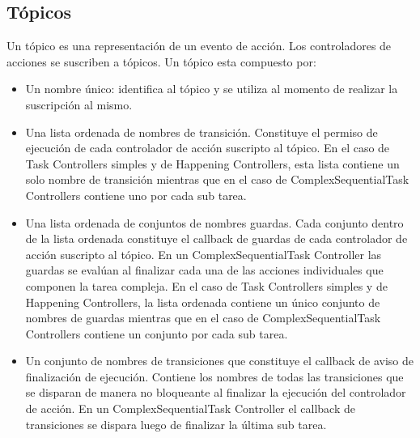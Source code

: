 \subsection{Tópicos}
\label{sec:diseno_topicos}
Un tópico es una representación de un evento de acción. Los controladores de
acciones se suscriben a tópicos.
Un tópico esta compuesto por:
\begin{itemize}
  \item Un nombre único: identifica al tópico y se utiliza al momento de
  realizar la suscripción al mismo.
  \item Una lista ordenada de nombres de transición. Constituye el permiso
  de ejecución de cada controlador de acción suscripto al tópico. En el caso de
  Task Controllers simples y de Happening Controllers, esta lista contiene
  un solo nombre de transición mientras que en el caso de ComplexSequentialTask
  Controllers contiene uno por cada sub tarea.
  \item Una lista ordenada de conjuntos de nombres guardas. Cada conjunto
   dentro de la lista ordenada constituye el callback de guardas de cada
   controlador de acción suscripto al tópico. En un ComplexSequentialTask
   Controller las guardas se evalúan al finalizar cada una de las acciones
   individuales que componen la tarea compleja. En el caso de
  Task Controllers simples y de Happening Controllers, la lista ordenada
  contiene un único conjunto de nombres de guardas mientras que en el caso de
  ComplexSequentialTask Controllers contiene un conjunto por cada sub tarea.
  \item Un conjunto de nombres de transiciones que constituye el callback de
  aviso de finalización de ejecución. Contiene los nombres de todas las
  transiciones que se disparan de manera no bloqueante al finalizar la ejecución
  del controlador de acción. En un  ComplexSequentialTask
  Controller el callback de transiciones se dispara luego de finalizar la última
  sub tarea.
\end{itemize}
